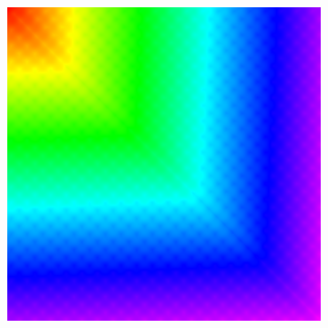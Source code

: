 \documentclass[11pt]{article}       %
\begin{document}
\begin{figure}
\begin{subfigure}[b]{.3\columnwidth}
	\end{subfigure}
	\begin{subfigure}[b]{.3\columnwidth}
		\includegraphics[width=\textwidth]{Figures/ghcm_systolic_sin_checkerboard}
	\end{subfigure}
	

\end{figure}
\end{document}
